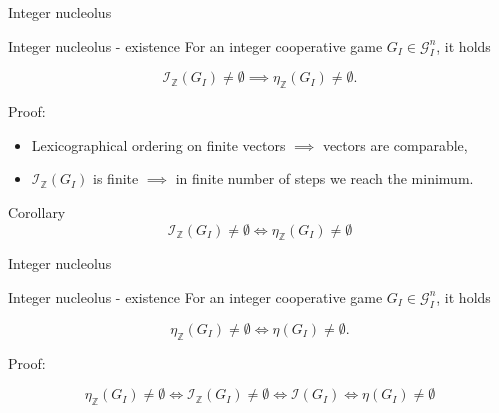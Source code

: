 \documentclass{beamer}
\newcommand{\Z}{\mathbb{Z}}
\begin{document}
\begin{frame}{Integer nucleolus}
    \pause
    \begin{block}{Integer nucleolus - existence}
        For an integer cooperative game $G_I \in \mathcal{G}_I^n$, it holds

        \begin{displaymath}
            \mathcal{I}_{\Z}(G_I) \neq \emptyset \implies \eta_\Z(G_I) \neq \emptyset.
        \end{displaymath}
    \end{block}
    \pause
    Proof:
    \pause
    \begin{itemize}
        \item Lexicographical ordering on finite vectors $\implies$ vectors are comparable,
        \pause
        \item $\mathcal{I}_{\Z}(G_I)$ is finite $\implies$ in finite number of steps we reach the minimum.
    \end{itemize}

    \pause
    \begin{block}{Corollary}
        \pause
        \begin{displaymath}
            \mathcal{I}_{\Z}(G_I) \neq \emptyset \iff \eta_\Z(G_I) \neq \emptyset
        \end{displaymath}
    \end{block}
\end{frame}



\begin{frame}{Integer nucleolus}
    \pause
    \begin{block}{Integer nucleolus - existence}
        For an integer cooperative game $G_I \in \mathcal{G}_I^n$, it holds

        \begin{displaymath}
            \eta_\Z(G_I) \neq \emptyset \iff \eta(G_I) \neq \emptyset.
        \end{displaymath}
    \end{block}

    \pause

    Proof:

    \pause

    \begin{displaymath}
        \eta_\Z(G_I) \neq \emptyset \iff \mathcal{I}_{\Z}(G_I) \neq \emptyset \iff \mathcal{I}(G_I) \iff \eta(G_I) \neq \emptyset
    \end{displaymath}
\end{frame}
\end{document}
